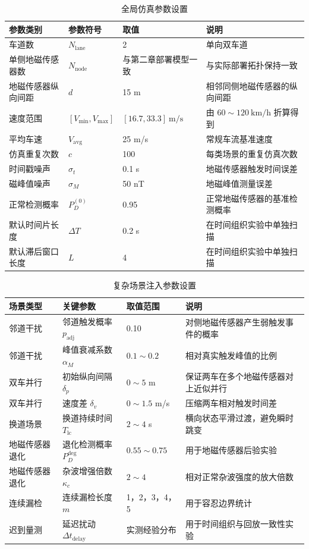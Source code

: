 \documentclass{xdupgthesis}
\begin{document}
\begin{table}[H]
	\centering
	\caption{全局仿真参数设置}
	\label{tab:ch3_sim_global}
	\small
	\begin{tabular}{p{2.4cm}p{2.3cm}p{3.0cm}p{5.0cm}}
		\toprule
		参数类别 & 参数符号 & 取值 & 说明 \\
		\midrule
		车道数 & $N_{\mathrm{lane}}$ & 2 & 单向双车道 \\
		单侧地磁传感器数 & $N_{\mathrm{node}}$ & 与第二章部署模型一致 & 与实际部署拓扑保持一致 \\
		地磁传感器纵向间距 & $d$ & 15 m & 相邻同侧地磁传感器的纵向间距 \\
		速度范围 & $[V_{\min},V_{\max}]$ & $[16.7,33.3]\ \mathrm{m/s}$ & 由 $60\sim120\ \mathrm{km/h}$ 折算得到 \\
		平均车速 & $V_{\mathrm{avg}}$ & 25 m/s & 常规车流基准速度 \\
		仿真重复次数 & $c$ & 100 & 每类场景的重复仿真次数 \\
		时间戳噪声 & $\sigma_t$ & 0.1 s & 地磁传感器触发时间误差 \\
		磁峰值噪声 & $\sigma_M$ & 50 nT & 地磁峰值测量误差 \\
		正常检测概率 & $P_D^{(0)}$ & 0.95 & 正常地磁传感器的基准检测概率 \\
		默认时间片长度 & $\Delta T$ & 0.2 s & 在时间组织实验中单独扫描 \\
		默认滞后窗口长度 & $L$ & 4 & 在时间组织实验中单独扫描 \\
		\bottomrule
	\end{tabular}
\end{table}

\begin{table}[H]
	\centering
	\caption{复杂场景注入参数设置}
	\label{tab:ch3_scene_inject}
	\small
	\begin{tabular}{p{2.4cm}p{2.6cm}p{3.0cm}p{5.0cm}}
		\toprule
		场景类型 & 关键参数 & 取值范围 & 说明 \\
		\midrule
		邻道干扰 & 邻道触发概率 $p_{\mathrm{adj}}$ & 0.10 & 对侧地磁传感器产生弱触发事件的概率 \\
		邻道干扰 & 峰值衰减系数 $\alpha_M$ & $0.1\sim0.2$ & 相对真实触发峰值的比例 \\
		双车并行 & 初始纵向间隔 $\delta_p$ & $0\sim5$ m & 保证两车在多个地磁传感器对上近似并行 \\
		双车并行 & 速度差 $\delta_v$ & $0\sim1.5$ m/s & 压缩两车相对触发时间差 \\
		换道场景 & 换道持续时间 $T_{\mathrm{lc}}$ & $2\sim4$ s & 横向状态平滑过渡，避免瞬时跳变 \\
		地磁传感器退化 & 退化检测概率 $P_D^{\mathrm{deg}}$ & $0.55\sim0.75$ & 用于地磁传感器后验实验 \\
		地磁传感器退化 & 杂波增强倍数 $\kappa_c$ & $2\sim4$ & 相对正常杂波强度的放大倍数 \\
		连续漏检 & 连续漏检长度 $m$ & 1，2，3，4，5 & 用于容忍边界统计 \\
		迟到量测 & 延迟扰动 $\Delta t_{\mathrm{delay}}$ & 实测经验分布 & 用于时间组织与回放一致性实验 \\
		\bottomrule
	\end{tabular}
\end{table}
\end{document}
